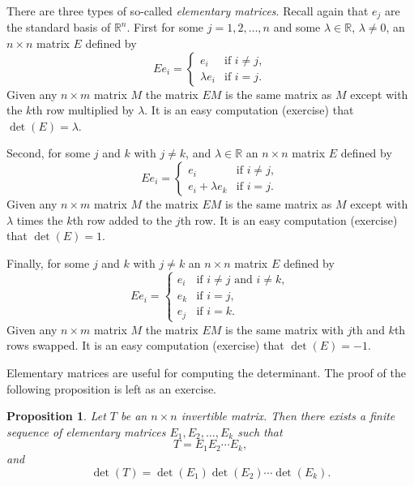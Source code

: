 \documentclass[12pt]{book}
\newcommand{\R}{{\mathbb{R}}}
\theoremstyle{plain}
\newtheorem{prop}[thm]{Proposition}
\theoremstyle{remark}
\theoremstyle{definition}
\theoremstyle{exercise}
\theoremstyle{example}
\begin{document}
There are three types of so-called
\emph{elementary matrices}.  Recall
again that $e_j$ are the standard basis of $\R^n$.
First for some $j =
1,2,\ldots,n$ and
some $\lambda \in \R$, $\lambda \neq 0$, an
$n \times n$ matrix $E$ defined by
\begin{equation*}
Ee_i = 
\begin{cases}
e_i & \text{if $i \neq j$} , \\
\lambda e_i & \text{if $i = j$} .
\end{cases}
\end{equation*}
Given any $n \times m$ matrix $M$ the matrix $EM$ is the same matrix as $M$
except with the $k$th row multiplied by $\lambda$.
It is an easy computation (exercise) that $\det(E) = \lambda$.

Second, for some $j$ and $k$ with $j\neq k$, and $\lambda \in \R$ an
$n \times n$ matrix $E$ defined by
\begin{equation*}
Ee_i = 
\begin{cases}
e_i & \text{if $i \neq j$} , \\
e_i + \lambda e_k & \text{if $i = j$} .
\end{cases}
\end{equation*}
Given any $n \times m$ matrix $M$ the matrix $EM$ is the same matrix as $M$
except with $\lambda$ times the $k$th row added to the $j$th row.
It is an easy computation (exercise) that $\det(E) = 1$.

Finally, for some $j$ and $k$ with $j\neq k$ an
$n \times n$ matrix $E$ defined by
\begin{equation*}
Ee_i = 
\begin{cases}
e_i & \text{if $i \neq j$ and $i \neq k$} , \\
e_k & \text{if $i = j$} , \\
e_j & \text{if $i = k$} .
\end{cases}
\end{equation*}
Given any $n \times m$ matrix $M$ the matrix $EM$ is the same matrix with
$j$th and $k$th rows swapped.
It is an easy computation (exercise) that $\det(E) = -1$.

Elementary matrices are useful for computing the determinant.
The proof of the following proposition is left as an exercise.

\begin{prop} \label{prop:elemmatrixdecomp}
Let $T$ be an $n \times n$ invertible matrix.  Then there exists a finite
sequence of elementary matrices $E_1, E_2, \ldots, E_k$ such that
\begin{equation*}
T = E_1 E_2 \cdots E_k ,
\end{equation*}
and
\begin{equation*}
\det(T) = \det(E_1)\det(E_2)\cdots \det(E_k) .
\end{equation*}
\end{prop}
\end{document}
